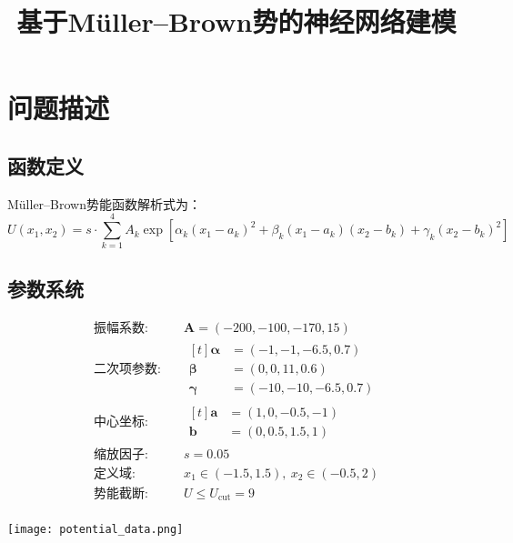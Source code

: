 \documentclass[11pt]{article}
\author{
    \makebox[0.8\textwidth]{%
        \centering
        杨远青 \quad 22300190015 \quad
        \href{https://github.com/bud-primordium/Computational-Physics-Fall-2024}{\raisebox{-2pt}{\texttt{[image: comphys.pdf]}}}
    }
}
\title{基于M\"{u}ller--Brown势的神经网络建模\\}
\begin{document}
\maketitle


\section{问题描述}
\subsection{函数定义}
M\"{u}ller--Brown势能函数解析式为：
\[
    U(x_1, x_2) = s \cdot \sum_{k=1}^4 A_k \exp\left[
        \alpha_k (x_1 - a_k)^2 + \beta_k (x_1 - a_k)(x_2 - b_k) + \gamma_k (x_2 - b_k)^2
        \right]
\]
\subsection{参数系统}
\begin{minipage}[t]{0.5\textwidth}
    \vspace{-\baselineskip}
    \begin{align*}
        \text{振幅系数:}  & \quad \bm{A} = (-200, -100, -170, 15)       \\
        \text{二次项参数:} & \quad
        \begin{aligned}[t]
            \bm{\alpha} & = (-1, -1, -6.5, 0.7)   \\
            \bm{\beta}  & = (0, 0, 11, 0.6)       \\
            \bm{\gamma} & = (-10, -10, -6.5, 0.7)
        \end{aligned}                       \\
        \text{中心坐标:}  & \quad
        \begin{aligned}[t]
            \bm{a} & = (1, 0, -0.5, -1) \\
            \bm{b} & = (0, 0.5, 1.5, 1)
        \end{aligned}                                 \\
        \text{缩放因子:}  & \quad s = 0.05                              \\
        \text{定义域:}   & \quad x_1 \in (-1.5,1.5),\ x_2 \in (-0.5,2) \\
        \text{势能截断:}  & \quad U \leq  U_{\text{cut}} = 9            \\
    \end{align*}
\end{minipage}
\hfill
\begin{minipage}[t]{0.48\textwidth}
    \vspace{-\baselineskip}
    \centering
    \texttt{[image: potential\_data.png]}
    \label{fig:surface}
\end{minipage}
\end{document}
